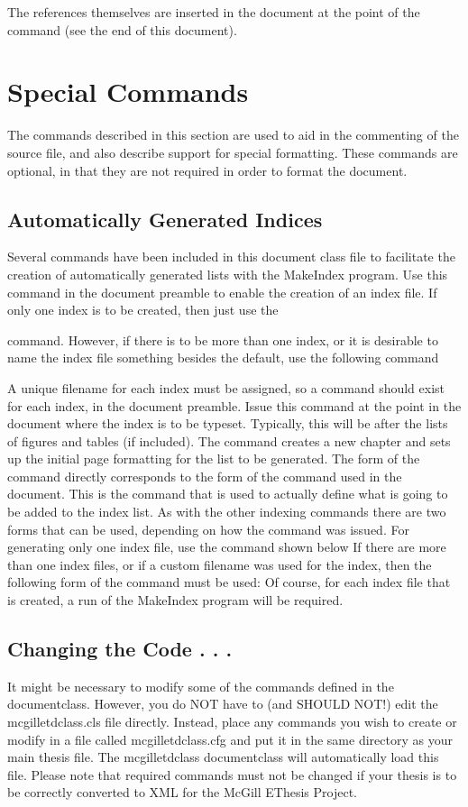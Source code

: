 \documentclass[12pt,Bold,letterpaper,TexShade]{mcgilletdclass}
\numberwithin{equation}{section}
\begin{document}
The references themselves are inserted in the document at
the point of the \verb== command
(see the end of this document).

\chapter{Special Commands}
The commands described in this section are used to aid in the commenting
of the source file, and also describe support for special formatting.
These commands are optional, in that they are not required in order
to format the document.
\section{Automatically Generated Indices}
Several commands have been included in this document class file to facilitate
the creation of automatically generated lists with the MakeIndex
program. 
Use this command in the document preamble to enable the creation of an 
index file. If only one index is to be created, then just use
the

command. However, if there is to be more than one index, or it is
desirable to name the index file something besides the default, use
the following command

A unique filename for each index must be assigned, so a 
command should exist for each index, in the document preamble.
Issue this command at the point in the document where the index 
is to be typeset. Typically, this will be after the lists of figures and
tables (if included). The command creates a new chapter and sets up
the initial page formatting for the list to be generated. The form of
the command directly corresponds to the form of the
command used in the document. 
This is the command that is used to actually define what is going to be 
added to the index list. As with the other indexing commands
there are two forms that can be used, depending on how the
command was issued. For generating only one index file,
use the command shown below
If there are more than one index files, or if a custom filename was used
for the index, then the following form of the command must be used:
Of course, for each index file that is created, a run of the
MakeIndex program will be required. 
\section{Changing the Code . . .}
It might be necessary to modify some of the commands defined in the
documentclass. However, you do NOT have to (and SHOULD NOT!) edit
the mcgilletdclass.cls file directly. Instead, place any commands
you wish to create or modify in a file called mcgilletdclass.cfg and
put it in the same directory as your main thesis file.  The mcgilletdclass
documentclass will automatically load this file.  Please note that 
required commands must not be changed if your thesis is to be correctly
converted to XML for the McGill EThesis Project.
\end{document}

